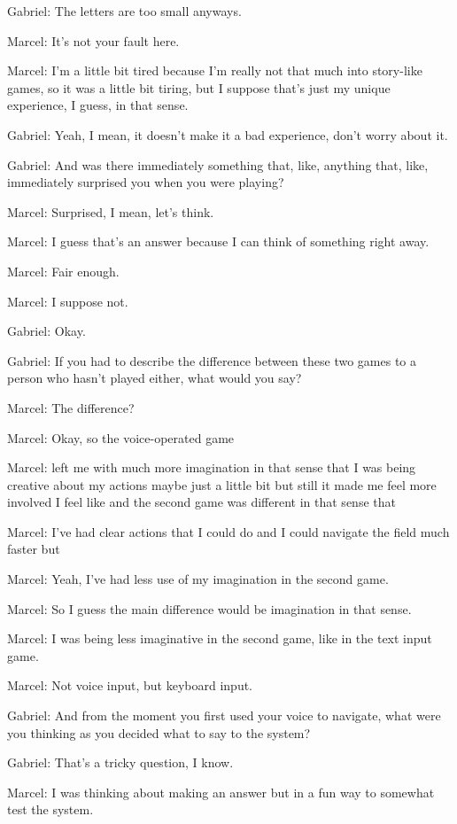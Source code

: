 Gabriel: The letters are too small anyways.

Marcel: It's not your fault here.

Marcel: I'm a little bit tired because I'm really not that much into story-like games, so it was a little bit tiring, but I suppose that's just my unique experience, I guess, in that sense.

Gabriel: Yeah, I mean, it doesn't make it a bad experience, don't worry about it.

Gabriel: And was there immediately something that, like, anything that, like, immediately surprised you when you were playing?

Marcel: Surprised, I mean, let's think.

Marcel: I guess that's an answer because I can think of something right away.

Marcel: Fair enough.

Marcel: I suppose not.

Gabriel: Okay.

Gabriel: If you had to describe the difference between these two games to a person who hasn't played either, what would you say?

Marcel: The difference?

Marcel: Okay, so the voice-operated game

Marcel: left me with much more imagination in that sense that I was being creative about my actions maybe just a little bit but still it made me feel more involved I feel like and the second game was different in that sense that

Marcel: I've had clear actions that I could do and I could navigate the field much faster but

Marcel: Yeah, I've had less use of my imagination in the second game.

Marcel: So I guess the main difference would be imagination in that sense.

Marcel: I was being less imaginative in the second game, like in the text input game.

Marcel: Not voice input, but keyboard input.

Gabriel: And from the moment you first used your voice to navigate, what were you thinking as you decided what to say to the system?

Gabriel: That's a tricky question, I know.

Marcel: I was thinking about making an answer but in a fun way to somewhat test the system.

